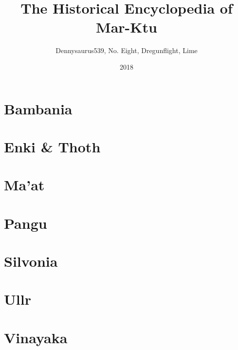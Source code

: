 \documentclass[ansiapaper, 11pt, openright, twoside]{book}
\title{The Historical Encyclopedia of Mar-Ktu}
\date{2018}
\author{Dennysaurus539, No. Eight, Dregunflight, Lime}
\begin{document}
	
	
	\chapter{Bambania}
	
	\chapter{Enki \& Thoth}
	
	\chapter{Ma'at}
	
	\chapter{Pangu}
	
	\chapter{Silvonia}
	
	\chapter{Ullr}
	
	\chapter{Vinayaka} 
	
	\printindex
	
\end{document}
